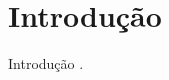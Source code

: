\documentclass[../main.tex]{subfiles}
\begin{document}
    \section{Introdução}
    Introdução \cite{Reis02021Apr}.
\end{document}
